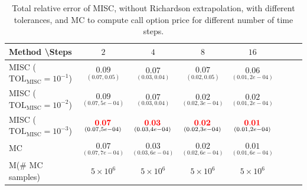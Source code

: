 %	
%	
%
%
%
\begin{table}[h!]
	\centering
	\begin{tabular}{l*{6}{c}r}
		Method \textbackslash  Steps            & $2$ & $4$ & $8$ & $16$  \\
		\hline

		MISC ($\text{TOL}_{\text{MISC}}=10^{-1}$)  & $\underset{(0.07,0.05)}{\mathbf{0.09}}$ & $\underset{(0.03,0.04)}{\mathbf{0.07}}$& $\underset{(0.02,0.05)}{\mathbf{ 0.07}}$ & $\underset{(0.01,2e-04)}{\mathbf{ 0.06}}$   \\

		MISC ($\text{TOL}_{\text{MISC}}=10^{-2}$)  &  $\underset{(0.07,5e-04)}{\mathbf{0.09}}$& $\underset{(0.03,0.04)}{\mathbf{0.07}}$& $\underset{(0.02,3e-04)}{\mathbf{ 0.02}}$ & $\underset{(0.01,2e-04)}{\mathbf{ 0.02}}$  \\
		MISC ($\text{TOL}_{\text{MISC}}=10^{-3}$)  &  $\underset{(0.07,5e-04)}{\mathbf{{\color{red}0.07}}}$& $\underset{(0.03,4e-04)}{\mathbf{{\color{red}0.03}}}$& $\underset{(0.02,3e-04)}{\mathbf{{\color{red}0.02}}}$  & $\underset{(0.01,2e-04)}{\mathbf{ {\color{red}0.01}}}$  \\

		\hline
		MC    & $\underset{(0.07,7e-04)}{\mathbf{0.07}}$  & $\underset{(0.03,6e-04)}{\mathbf{0.03}}$  & $\underset{(0.02,6e-04)}{\mathbf{0.02}}$ & $\underset{(0.01,6e-04)}{\mathbf{0.01}}$  \\		
			M(\# MC samples)   & $5 \times 10^6$  & $5 \times 10^6$  & $5 \times 10^6$ & $5 \times 10^6$  \\		
		\hline
	\end{tabular}
	\caption{Total relative error of MISC, without Richardson extrapolation, with  different tolerances,  and MC to compute call option price  for different number of time steps.}
	\label{Total error of MISC and MC to compute Call option price of the different tolerances for different number of time steps. Case set 5, without Richardson extrapolation. The numbers between parentheses are the corresponding absolute errors.}
\end{table}


